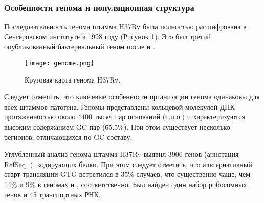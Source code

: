 \subsubsection{Особенности генома и популяционная структура }
Последовательность генома  штамма H37Rv была полностью расшифрована в Сенгеровском институте в 1998 году \cite{cole1998erratum} (Рисунок \ref{genome}). Это был третий опубликованный бактериальный геном после  \cite{fleischmann1995whole} и  \cite{fraser1995minimal}.

\begin{figure}[h!]
    \begin{center}
        \texttt{[image: genome.png]}
    \end{center}
\caption[foo bar]{Круговая карта генома  H37Rv.}
\label{genome}
\end{figure}

Следует отметить, что ключевые особенности организации генома одинаковы для всех штаммов патогена. Геномы представлены кольцевой молекулой ДНК протяженностью около 4400 тысяч пар оснований (т.п.о.) и характеризуются высоким содержанием GC пар (\~ 65.5\%). При этом существует несколько регионов, отличающихся по GC составу.

Углубленный анализ генома  штамма H37Rv выявил 3906 генов (аннотация RefSeq, ), кодирующих белки. При этом следует отметить, что альтернативный старт трансляции GTG встретился в 35\% случаев, что существенно чаще, чем 14\% и 9\% в геномах  и , соответственно. Был найден один набор рибосомных генов и 45 транспортных РНК.

